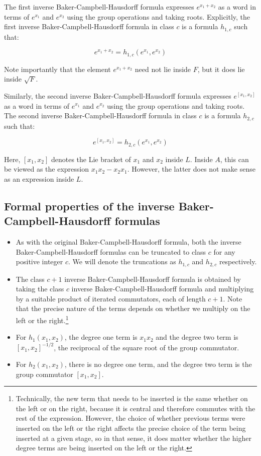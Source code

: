 The first inverse Baker-Campbell-Hausdorff formula expresses $e^{x_1 +
  x_2}$ as a word in terms of $e^{x_1}$ and $e^{x_2}$ using the group
operations and taking roots. Explicitly, the first inverse
Baker-Campbell-Hausdorff formula in class $c$ is a formula $h_{1,c}$
such that:

$$e^{x_1 + x_2} = h_{1,c}(e^{x_1},e^{x_2})$$

Note importantly that the element $e^{x_1+x_2}$ need not lie inside
$F$, but it does lie inside $\sqrt{F}$.

Similarly, the second inverse Baker-Campbell-Hausdorff formula
expresses $e^{[x_1,x_2]}$ as a word in terms of $e^{x_1}$ and
$e^{x_2}$ using the group operations and taking roots. The second
inverse Baker-Campbell-Hausdorff formula in class $c$ is a formula
$h_{2,c}$ such that:

$$e^{[x_1,x_2]} = h_{2,c}(e^{x_1},e^{x_2})$$

Here, $[x_1,x_2]$ denotes the Lie bracket of $x_1$ and $x_2$ inside
$L$. Inside $A$, this can be viewed as the expression $x_1x_2 -
x_2x_1$. However, the latter does not make sense as an expression
inside $L$.

\subsection{Formal properties of the inverse Baker-Campbell-Hausdorff formulas}\label{sec:inverse-bch-formal-properties}

\begin{itemize}
\item As with the original Baker-Campbell-Hausdorff formula, both the
  inverse \\ Baker-Campbell-Hausdorff formulas can be truncated to class
  $c$ for any positive integer $c$. We will denote the truncations as
  $h_{1,c}$ and $h_{2,c}$ respectively.
\item The class $c + 1$ inverse Baker-Campbell-Hausdorff formula is
  obtained by taking the class $c$ inverse Baker-Campbell-Hausdorff
  formula and multiplying by a suitable product of iterated
  commutators, each of length $c + 1$. Note that the precise nature of
  the terms depends on whether we multiply on the left or the
  right.\footnote{Technically, the new term that needs to be inserted
    is the same whether on the left or on the right, because it is
    central and therefore commutes with the rest of the
    expression. However, the choice of whether previous terms were
    inserted on the left or the right affects the precise choice of
    the term being inserted at a given stage, so in that sense, it
    does matter whether the higher degree terms are being inserted on
    the left or the right.}
\item For $h_1(x_1,x_2)$, the degree one term is $x_1x_2$ and the
  degree two term is $[x_1,x_2]^{-1/2}$, the reciprocal of the square
  root of the group commutator.
\item For $h_2(x_1,x_2)$, there is no degree one term, and the degree
  two term is the group commutator $[x_1,x_2]$.
\end{itemize}

